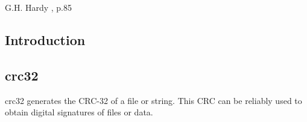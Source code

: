 \chapter[\ccchzeroshorttitle{}]{\ccchzerolongtitle{}}

\label{ccch0}

                   {G.H. Hardy \cite{bibref:b:mathematiciansapology:1940},
                   p.85}

\section{Introduction}


\section{crc32}

\begin{tclcommandname}{crc32}%
generates the CRC-32 of a file or string.  This CRC can be reliably used to obtain
digital signatures of files or data.
\end{tclcommandname}

\begin{tclcommandsynopsis}
\end{tclcommandsynopsis}

